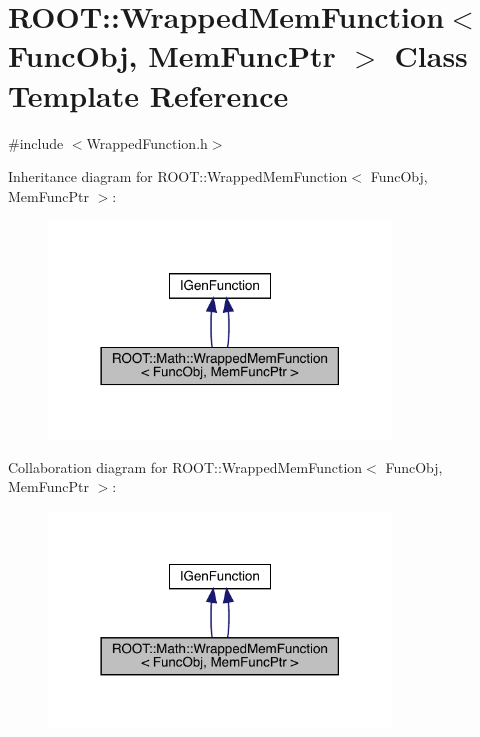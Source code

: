 \hypertarget{classROOT_1_1Math_1_1WrappedMemFunction}{}\section{R\+O\+OT\+:\+:Wrapped\+Mem\+Function$<$ Func\+Obj, Mem\+Func\+Ptr $>$ Class Template Reference}
\label{classROOT_1_1Math_1_1WrappedMemFunction}


{\ttfamily \#include $<$Wrapped\+Function.\+h$>$}



Inheritance diagram for R\+O\+OT\+:\+:Wrapped\+Mem\+Function$<$ Func\+Obj, Mem\+Func\+Ptr $>$\+:\nopagebreak
\begin{figure}[H]
\begin{center}
\leavevmode
\includegraphics[width=258pt]{df/d6b/classROOT_1_1Math_1_1WrappedMemFunction__inherit__graph}
\end{center}
\end{figure}


Collaboration diagram for R\+O\+OT\+:\+:Wrapped\+Mem\+Function$<$ Func\+Obj, Mem\+Func\+Ptr $>$\+:\nopagebreak
\begin{figure}[H]
\begin{center}
\leavevmode
\includegraphics[width=258pt]{de/d86/classROOT_1_1Math_1_1WrappedMemFunction__coll__graph}
\end{center}
\end{figure}
